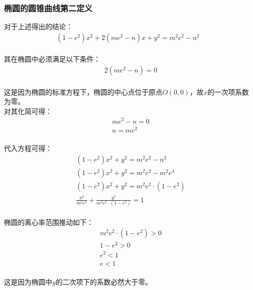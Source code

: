 \documentclass[UTF8]{ctexart}
\begin{document}
\subsubsection{椭圆的圆锥曲线第二定义}
    \setcounter{equation}{0}
    对于上述得出的结论：
    \begin{align}
        \left(1-e^2\right)x^2+2\left(me^2-n\right)x+y^2=m^2e^2-n^2
    \end{align}\\
    其在椭圆中必须满足以下条件：
    \begin{align}
        &2\left(me^2-n\right)=0
    \end{align}\\
    这是因为椭圆的标准方程下，椭圆的中心点位于原点$O(0,0)$，故$x$的一次项系数为零。\\[10mm]
    对其化简可得：
    \begin{align}
        &me^2-n=0\\[3mm]
        &n=me^2
    \end{align}\\
    代入方程可得：
    \begin{align}
        &\left(1-e^2\right)x^2+y^2=m^2e^2-n^2\\[3mm]
        &\left(1-e^2\right)x^2+y^2=m^2e^2-m^2e^4\\[3mm]
        &\left(1-e^2\right)x^2+y^2=m^2e^2\cdot\left(1-e^2\right)\\[3mm]
        &\frac{x^2}{m^2e^2}+\frac{y^2}{m^2e^2\cdot\left(1-e^2\right)}=1
    \end{align}\\[1mm]
    椭圆的离心率范围推动如下：\vspace{3pt}
    \begin{align}
        &m^2e^2\cdot\left(1-e^2\right)>0\\[3mm]
        &1-e^2>0\\[3mm]
        &e^2<1\\[3mm]
        &e<1
    \end{align}\\
    这是因为椭圆中$y$的二次项下的系数必然大于零。

\newpage
\end{document}
